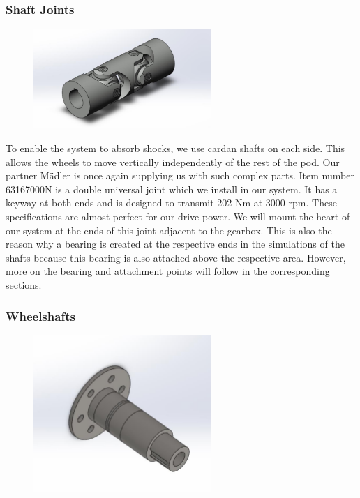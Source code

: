 \subsubsection{Shaft Joints}
\begin{figure}[H]
\centering
\includegraphics[width=0.6\textwidth]{texfiles/mech/eimg/propulsion/picture_shaft_joint}
\caption{}
\label{}
\end{figure}


To enable the system to absorb shocks, we use cardan shafts on each side. This allows the wheels to move vertically independently of the rest of the pod. Our partner Mädler is once again supplying us with such complex parts. Item number 63167000N is a double universal joint which we install in our system. It has a keyway at both ends and is designed to transmit 202 Nm at 3000 rpm. These specifications are almost perfect for our drive power.
We will mount the heart of our system at the ends of this joint adjacent to the gearbox. This is also the reason why a bearing is created at the respective ends in the simulations of the shafts because this bearing is also attached above the respective area.
However, more on the bearing and attachment points will follow in the corresponding sections.

\subsubsection{Wheelshafts}
\begin{figure}[ht]
\centering
\includegraphics[width=0.6\textwidth]{texfiles/mech/eimg/propulsion/picture_wheelshaft}
\caption{}
\label{}
\end{figure}

